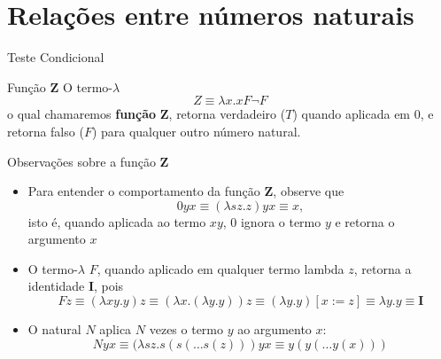 \section{Relações entre números naturais}

\begin{frame}[fragile]{Teste Condicional}

    \begin{block}{Função $\mathbf{Z}$}
        O termo-$\lambda$
        \[
            Z\equiv \lambda x.xF\lnot F
        \]
        o qual chamaremos \textbf{função} $\mathbf{Z}$, retorna verdadeiro ($T$) quando aplicada
        em $0$, e retorna falso ($F$) para qualquer outro número natural.
    \end{block}

\end{frame}

\begin{frame}[fragile]{Observações sobre a função $\mathbf{Z}$}

    \begin{itemize}
        \item Para entender o comportamento da função $\mathbf{Z}$, observe que
        \[
            0yx \equiv (\lambda sz.z)yx \equiv x,
        \]
        isto é, quando aplicada ao termo $xy$, $0$ ignora o termo $y$ e retorna o argumento
        $x$

        \item O termo-$\lambda$ $F$, quando aplicado em qualquer termo lambda $z$, 
        retorna a identidade $\mathbf{I}$, pois
        \[
            Fz \equiv (\lambda xy.y)z \equiv (\lambda x.(\lambda y.y))z \equiv (\lambda y.y)[x:=z]
                \equiv \lambda y.y \equiv \mathbf{I}
        \]

        \item O natural $N$ aplica $N$ vezes o termo $y$ ao argumento $x$:
        \[
            Nyx \equiv (\lambda sz.s(s(\ldots s(z)))yx \equiv y(y(\ldots y(x)))
        \]
    \end{itemize}

\end{frame}

